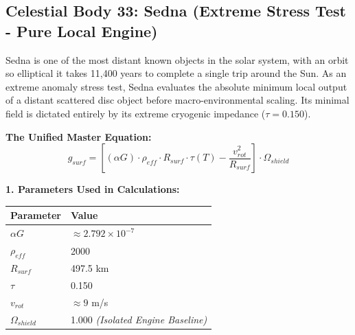 \documentclass[11pt, a4paper]{article}
\begin{document}
\clearpage
\subsection{Celestial Body 33: Sedna (Extreme Stress Test - Pure Local Engine)}
  Sedna is one of the most distant known objects in the solar system, with an orbit so elliptical it takes 11,400 years to complete a single trip around the Sun. As an extreme anomaly stress test, Sedna evaluates the absolute minimum local output of a distant scattered disc object before macro-environmental scaling. Its minimal field is dictated entirely by its extreme cryogenic impedance ($\tau = 0.150$).

  \vspace{0.5em}
  \noindent \textbf{The Unified Master Equation:}
  $$ g_{surf} = \left[ (\alpha G) \cdot \rho_{eff} \cdot R_{surf} \cdot \tau(T) - \frac{v_{rot}^2}{R_{surf}} \right] \cdot \Omega_{shield} $$

  \vspace{0.5em}
  \noindent \textbf{1. Parameters Used in Calculations:} \\[0.5em]
  \begingroup
  \renewcommand{\arraystretch}{1.3}
  \hspace*{2em}
  \begin{tabular}{|l|l|}
    \hline
    \textbf{Parameter} & \textbf{Value} \\ \hline
    $\alpha G$ & $\approx 2.792 \times 10^{-7}$ \\ \hline
    $\rho_{eff}$ & 2000 \\ \hline
    $R_{surf}$ & 497.5 km \\ \hline
    $\tau$ & 0.150 \\ \hline
    $v_{rot}$ & $\approx 9$ m/s \\ \hline
    $\Omega_{shield}$ & 1.000 \textit{(Isolated Engine Baseline)} \\ \hline
  \end{tabular}
  \endgroup
\end{document}
